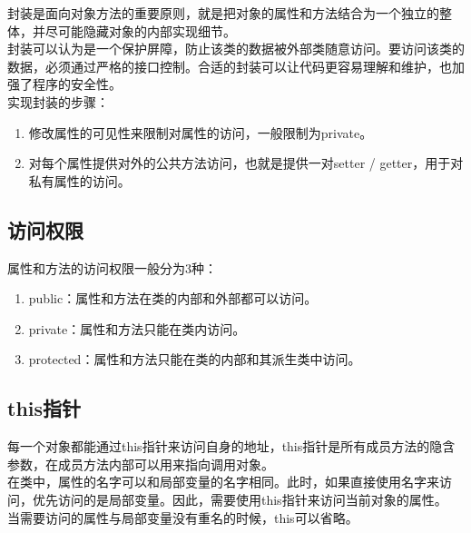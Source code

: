 封装是面向对象方法的重要原则，就是把对象的属性和方法结合为一个独立的整体，并尽可能隐藏对象的内部实现细节。\\

封装可以认为是一个保护屏障，防止该类的数据被外部类随意访问。要访问该类的数据，必须通过严格的接口控制。合适的封装可以让代码更容易理解和维护，也加强了程序的安全性。\\

实现封装的步骤：

\begin{enumerate}
	\item 修改属性的可见性来限制对属性的访问，一般限制为private。
	\item 对每个属性提供对外的公共方法访问，也就是提供一对setter / getter，用于对私有属性的访问。
\end{enumerate}

\vspace{0.5cm}

\subsection{访问权限}

属性和方法的访问权限一般分为3种：

\begin{enumerate}
	\item public：属性和方法在类的内部和外部都可以访问。
	\item private：属性和方法只能在类内访问。
	\item protected：属性和方法只能在类的内部和其派生类中访问。
\end{enumerate}

\vspace{0.5cm}

\subsection{this指针}

每一个对象都能通过this指针来访问自身的地址，this指针是所有成员方法的隐含参数，在成员方法内部可以用来指向调用对象。\\

在类中，属性的名字可以和局部变量的名字相同。此时，如果直接使用名字来访问，优先访问的是局部变量。因此，需要使用this指针来访问当前对象的属性。\\

当需要访问的属性与局部变量没有重名的时候，this可以省略。\\


